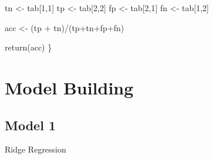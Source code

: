 \documentclass[
]{article}
\newenvironment{Shaded}{\begin{snugshade}}{\end{snugshade}}
\newcommand{\DecValTok}[1]{\textcolor[rgb]{0.00,0.00,0.81}{#1}}
\newcommand{\FunctionTok}[1]{\textcolor[rgb]{0.00,0.00,0.00}{#1}}
\newcommand{\NormalTok}[1]{#1}
\newcommand{\OtherTok}[1]{\textcolor[rgb]{0.56,0.35,0.01}{#1}}
\newcommand{\SpecialCharTok}[1]{\textcolor[rgb]{0.00,0.00,0.00}{#1}}
\begin{document}
\begin{Shaded}
\begin{Highlighting}[]
\NormalTok{tn }\OtherTok{\textless{}{-}}\NormalTok{ tab[}\DecValTok{1}\NormalTok{,}\DecValTok{1}\NormalTok{]}
\NormalTok{tp }\OtherTok{\textless{}{-}}\NormalTok{ tab[}\DecValTok{2}\NormalTok{,}\DecValTok{2}\NormalTok{]}
\NormalTok{fp }\OtherTok{\textless{}{-}}\NormalTok{ tab[}\DecValTok{2}\NormalTok{,}\DecValTok{1}\NormalTok{]}
\NormalTok{fn }\OtherTok{\textless{}{-}}\NormalTok{ tab[}\DecValTok{1}\NormalTok{,}\DecValTok{2}\NormalTok{]}

\NormalTok{acc }\OtherTok{\textless{}{-}}\NormalTok{ (tp }\SpecialCharTok{+}\NormalTok{ tn)}\SpecialCharTok{/}\NormalTok{(tp}\SpecialCharTok{+}\NormalTok{tn}\SpecialCharTok{+}\NormalTok{fp}\SpecialCharTok{+}\NormalTok{fn)}

\FunctionTok{return}\NormalTok{(acc)}
\NormalTok{\}}
\end{Highlighting}
\end{Shaded}

\hypertarget{model-building}{%
\section{Model Building}\label{model-building}}

\hypertarget{model-1}{%
\subsection{Model 1}\label{model-1}}

Ridge Regression
\end{document}

